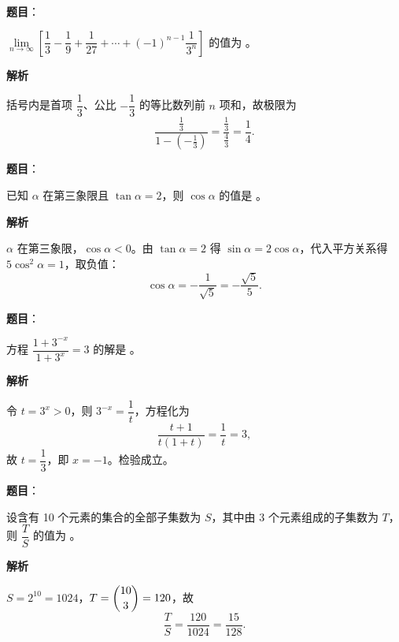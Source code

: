 \begin{answer}

\textbf{题目}：

\(\lim\limits_{n\to\infty}\left[\dfrac{1}{3}-\dfrac{1}{9}+\dfrac{1}{27}+\cdots+(-1)^{n-1}\dfrac{1}{3^n}\right]\) 的值为 \underline{\qquad}。

\textbf{解析}

括号内是首项 \(\dfrac13\)、公比 \(-\dfrac13\) 的等比数列前 \(n\) 项和，故极限为
\nopagebreak[4]
\[
\frac{\frac13}{1-\left(-\frac13\right)}
=\frac{\frac13}{\frac43}=\frac14.
\]


\end{answer}
\begin{answer}

\textbf{题目}：

已知 \(\alpha\) 在第三象限且 \(\tan\alpha=2\)，则 \(\cos\alpha\) 的值是 \underline{\qquad}。

\textbf{解析}

\(\alpha\) 在第三象限，\(\cos\alpha<0\)。由 \(\tan\alpha=2\) 得 \(\sin\alpha=2\cos\alpha\)，代入平方关系得 \(5\cos^2\alpha=1\)，取负值：
\nopagebreak[4]
\[
\cos\alpha=-\frac{1}{\sqrt5}=-\frac{\sqrt5}{5}.
\]


\end{answer}
\begin{answer}

\textbf{题目}：

方程 \(\dfrac{1+3^{-x}}{1+3^x}=3\) 的解是 \underline{\qquad}。

\textbf{解析}

令 \(t=3^x>0\)，则 \(3^{-x}=\dfrac1t\)，方程化为
\nopagebreak[4]
\[
\frac{t+1}{t(1+t)}=\frac1t=3,
\]
故 \(t=\dfrac13\)，即 \(x=-1\)。检验成立。


\end{answer}
\begin{answer}

\textbf{题目}：

设含有 10 个元素的集合的全部子集数为 \(S\)，其中由 3 个元素组成的子集数为 \(T\)，则 \(\dfrac{T}{S}\) 的值为 \underline{\qquad}。

\textbf{解析}

\(S=2^{10}=1024\)，\(T=\dbinom{10}{3}=120\)，故
\nopagebreak[4]
\[
\frac TS=\frac{120}{1024}=\frac{15}{128}.
\]


\end{answer}
